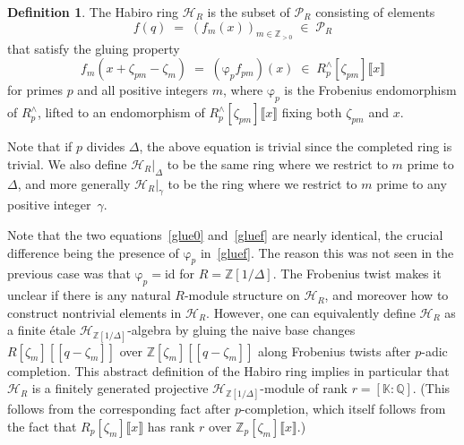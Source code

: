 \documentclass[12pt,reqno]{amsart}
\theoremstyle{definition}
\newtheorem{definition}[proposition]{Definition}
\def\BZ{\mathbb Z}
\def\BQ{\mathbb Q}
\def\BK{\mathbb K}
\def\calP{\mathcal P}
\def\calH{\mathcal H}
\def\be{\begin{equation}}
\def\ee{\end{equation}}
\def\z{\zeta}
\def\={\;=\;}
\def\inn{\;\in\;}
\def\fr{\mathrm{\varphi}_p}
\begin{document}
\begin{definition}
\label{def.hab}
The Habiro ring $\calH_{R}$ is the subset of $\calP_R$ consisting of elements
\be
\label{habf}
f(q)\=(f_m(x))_{m\in\BZ_{>0}} \inn \calP_R
\ee
that satisfy the gluing property
\be
\label{gluef}
f_m(x+\z_{pm}-\z_m) \= (\fr f_{pm})(x)
\inn R^\wedge_p[\z_{pm}]\llbracket x \rrbracket
\ee
for primes $p$ and all positive integers $m$, where $\fr$ is the Frobenius
endomorphism of $R_p^{\wedge}$, lifted to an endomorphism of
$R^\wedge_p[\z_{pm}]\llbracket x \rrbracket$ fixing both $\z_{pm}$ and $x$.
\end{definition}

\noindent Note that if $p$ divides $\Delta$,
the above equation is trivial since the completed ring is trivial.
We also define $\calH_{R}|_{\Delta}$ to be the same ring where we restrict to
$m$ prime to $\Delta$,
and more generally $\calH_{R}|_{\gamma}$ to be the ring where we restrict to
$m$ prime to any positive integer~$\gamma$.

Note that the two equations~\eqref{glue0} and~\eqref{gluef} are nearly identical,
the crucial difference being the presence of $\fr$ in~\eqref{gluef}.
The reason this was not seen in the previous case was that $\fr=\mathrm{id}$
for $R=\BZ[1/\Delta]$.
The Frobenius twist makes it unclear if there is any natural $R$-module
structure on $\calH_{R}$, and moreover how to construct nontrivial elements in
$\calH_{R}$.
However, one can equivalently define $\calH_R$ as a finite \'etale
$\calH_{\BZ[1/\Delta]}$-algebra by gluing the naive base changes
$R[\zeta_m][\![q-\zeta_m]\!]$ over $\BZ[\zeta_m][\![q-\zeta_m]\!]$ along Frobenius
twists after $p$-adic completion. This abstract definition of the Habiro ring
implies in particular that $\calH_{R}$ is a finitely generated projective
$\calH_{\BZ[1/\Delta]}$-module of rank $r=[\BK:\BQ]$.
(This follows from the corresponding fact after $p$-completion, which itself follows
from the fact that $R_p[\z_{m}]\llbracket x \rrbracket$ has rank $r$ over
$\BZ_p[\z_{m}]\llbracket x \rrbracket$.)
\end{document}
